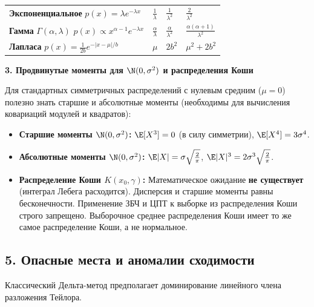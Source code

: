 \begin{HackBox}
\begin{tabular}{p{} p{} p{} p{}}
    \textbf{Экспоненциальное} \newline $p(x) = \lambda e^{-\lambda x}$ 
    & $\frac{1}{\lambda}$ 
    & $\frac{1}{\lambda^2}$ 
    & $\frac{2}{\lambda^2}$ \\

    \textbf{Гамма} $\Gamma(\alpha, \lambda)$ \newline $p(x) \propto x^{\alpha-1} e^{-\lambda x}$
    & $\frac{\alpha}{\lambda}$ 
    & $\frac{\alpha}{\lambda^2}$ 
    & $\frac{\alpha(\alpha+1)}{\lambda^2}$ \\

    \textbf{Лапласа} \newline $p(x) = \frac{1}{2b}e^{-|x-\mu|/b}$
    & $\mu$ 
    & $2b^2$ 
    & $\mu^2 + 2b^2$ \\
\end{tabular}

\vspace{1em}
\textbf{\textsf{3. Продвинутые моменты для $\N(0, \sigma^2)$ и распределения Коши}}
\vspace{0.2em}

Для стандартных симметричных распределений с нулевым средним ($\mu = 0$) полезно знать старшие и абсолютные моменты (необходимы для вычисления ковариаций модулей и квадратов):
\begin{itemize}
    \item \textbf{Старшие моменты $\N(0, \sigma^2)$:} $\E[X^3] = 0$ (в силу симметрии), $\E[X^4] = 3\sigma^4$.
    \item \textbf{Абсолютные моменты $\N(0, \sigma^2)$:} $\E|X| = \sigma \sqrt{\frac{2}{\pi}}$, \quad $\E|X|^3 = 2\sigma^3 \sqrt{\frac{2}{\pi}}$.
    \item \textbf{Распределение Коши $K(x_0, \gamma)$:} Математическое ожидание \textbf{не существует} (интеграл Лебега расходится). Дисперсия и старшие моменты равны бесконечности. Применение ЗБЧ и ЦПТ к выборке из распределения Коши строго запрещено. Выборочное среднее распределения Коши имеет то же самое распределение Коши, а не нормальное.
\end{itemize}
\end{HackBox}

\subsection*{5. Опасные места и аномалии сходимости}

Классический Дельта-метод предполагает доминирование линейного члена разложения Тейлора. 

